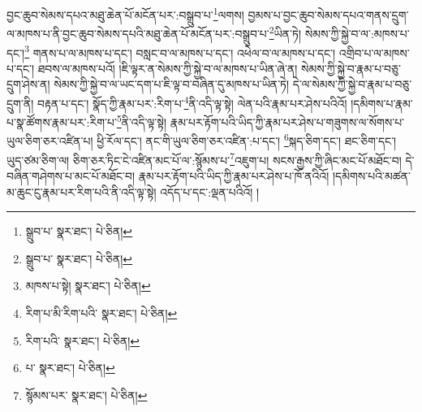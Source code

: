 བྱང་ཆུབ་སེམས་དཔའ་མཐུ་ཆེན་པོ་མངོན་པར་:བསྒྲུབ་པ་\footnote{སྒྲུབ་པ་  སྣར་ཐང་།  པེ་ཅིན། }ལགས། བྱམས་པ་བྱང་ཆུབ་སེམས་དཔའ་གནས་དྲུག་ལ་མཁས་པ་ནི་བྱང་ཆུབ་སེམས་དཔའི་མཐུ་ཆེན་པོ་མངོན་པར་:བསྒྲུབ་པ་\footnote{སྒྲུབ་པ་  སྣར་ཐང་།  པེ་ཅིན། }ཡིན་ཏེ། སེམས་ཀྱི་སྐྱེ་བ་ལ་:མཁས་པ་དང་།\footnote{མཁས་པ་སྟེ།  སྣར་ཐང་།  པེ་ཅིན། } གནས་པ་ལ་མཁས་པ་དང་། བསླང་བ་ལ་མཁས་པ་དང་། འཕེལ་བ་ལ་མཁས་པ་དང་། འགྲིབ་པ་ལ་མཁས་པ་དང་། ཐབས་ལ་མཁས་པའོ། །ཇི་ལྟར་ན་སེམས་ཀྱི་སྐྱེ་བ་ལ་མཁས་པ་ཡིན་ཞེ་ན། སེམས་ཀྱི་སྐྱེ་བ་རྣམ་པ་བཅུ་དྲུག་ཤེས་ན། སེམས་ཀྱི་སྐྱེ་བ་ལ་ཡང་དག་པ་ཇི་ལྟ་བ་བཞིན་དུ་མཁས་པ་ཡིན་ཏེ། དེ་ལ་སེམས་ཀྱི་སྐྱེ་བ་རྣམ་པ་བཅུ་དྲུག་ནི། བརྟན་པ་དང་། སྣོད་ཀྱི་རྣམ་པར་:རིག་པ་\footnote{རིག་པ་མི་རིག་པའི་  སྣར་ཐང་།  པེ་ཅིན། }ནི་འདི་ལྟ་སྟེ། ལེན་པའི་རྣམ་པར་ཤེས་པའིའོ། །དམིགས་པ་རྣམ་པ་སྣ་ཚོགས་རྣམ་པར་:རིག་པ་\footnote{རིག་པའི་  སྣར་ཐང་།  པེ་ཅིན། }ནི་འདི་ལྟ་སྟེ། རྣམ་པར་རྟོག་པའི་ཡིད་ཀྱི་རྣམ་པར་ཤེས་པ་གཟུགས་ལ་སོགས་པ་ཡུལ་ཅིག་ཅར་འཛིན་པ། ཕྱི་རོལ་དང་། ནང་གི་ཡུལ་ཅིག་ཅར་འཛིན་:པ་དང་། \footnote{པ་  སྣར་ཐང་།  པེ་ཅིན། }སྐད་ཅིག་དང་། ཐང་ཅིག་དང་། ཡུད་ཙམ་ཅིག་ལ། ཅིག་ཅར་ཏིང་ངེ་འཛིན་མང་པོ་ལ་:སྙོམས་པ་\footnote{སྙོམས་པར་  སྣར་ཐང་།  པེ་ཅིན། }འཇུག་པ། སངས་རྒྱས་ཀྱི་ཞིང་མང་པོ་མཐོང་བ། དེ་བཞིན་གཤེགས་པ་མང་པོ་མཐོང་བ། རྣམ་པར་རྟོག་པའི་ཡིད་ཀྱི་རྣམ་པར་ཤེས་པ་ཁོ་ནའིའོ། །དམིགས་པའི་མཚན་མ་ཆུང་ངུ་རྣམ་པར་རིག་པའི་ནི་འདི་ལྟ་སྟེ། འདོད་པ་དང་:ལྡན་པའིའོ། །
